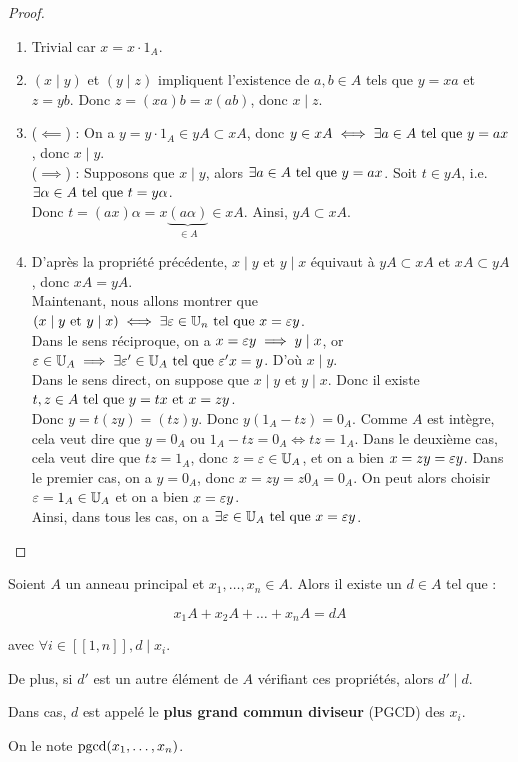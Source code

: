 \documentclass[12pt,a4paper]{report}
\begin{document}
\begin{proof}
    \begin{enumerate}
        \item Trivial car $x = x \cdot 1_A$.
        \item $(x \mid y)$ et $(y \mid z)$ impliquent l'existence de $a,b \in A$ tels que $y = xa$ et $z = yb$. Donc $z = (xa)b = x(ab)$, donc $x \mid z$.
        \item ($\impliedby$) : On a $y=y\cdot 1_A \in yA \subset xA$, donc $y \in xA \iff \exists a \in A \text{ tel que } y = ax$, donc $x\mid y$.\\($\implies$) : Supposons que $x\mid y$, alors $\exists a \in A \text{ tel que } y = ax$. Soit $t \in yA$, i.e. $\exists \alpha \in A \text{ tel que } t = y\alpha$.\\Donc $t = (ax)\alpha = x\underbrace{(a\alpha)}_{\in A} \in xA$. Ainsi, $yA \subset xA$.
        \item D'après la propriété précédente, $x\mid y$ et $y \mid x$ équivaut à $yA \subset xA$ et $xA \subset yA$, donc $xA = yA$.\\Maintenant, nous allons montrer que $(x \mid y \text{ et } y \mid x) \iff \exists \varepsilon \in \mathbb{U}_n \text{ tel que } x = \varepsilon y$.\\Dans le sens réciproque, on a $x=\varepsilon y \implies y \mid x$, or $\varepsilon \in \mathbb{U}_A \implies \exists \varepsilon' \in \mathbb{U}_A \text{ tel que } \varepsilon'x=y$. D'où $x\mid y$.\\Dans le sens direct, on suppose que $x\mid y$ et $y \mid x$. Donc il existe $t,z \in A \text{ tel que } y=tx \text{ et } x=zy$.\\Donc $y=t(zy) = (tz)y$. Donc $y(1_A - tz) = 0_A$. Comme $A$ est intègre, cela veut dire que $y=0_A$ ou $1_A - tz = 0_A \iff tz = 1_A$. Dans le deuxième cas, cela veut dire que $tz=1_A$, donc $z=\varepsilon \in \mathbb{U}_A$, et on a bien $x = zy = \varepsilon y$. Dans le premier cas, on a $y=0_A$, donc $x=zy= z0_A = 0_A$. On peut alors choisir $\varepsilon = 1_A \in \mathbb{U}_A$ et on a bien $x=\varepsilon y$.\\Ainsi, dans tous les cas, on a $\exists \varepsilon \in \mathbb{U}_A \text{ tel que } x = \varepsilon y$.
    \end{enumerate}
\end{proof}

\begin{theorem}
    Soient $A$ un anneau principal et $x_1,\dots,x_n \in A$. Alors il existe un $d \in A$ tel que :

    $$x_1 A + x_2 A + \dots + x_n A = dA$$

    avec $\forall i \in [\![1,n]\!], d \mid x_i$.

    De plus, si $d'$ est un autre élément de $A$ vérifiant ces propriétés, alors $d' \mid d$.

    Dans cas, $d$ est appelé le \textbf{plus grand commun diviseur} (PGCD) des $x_i$.

    On le note $\mathrm{pgcd}(x_1,\dots,x_n)$.
\end{theorem}
\end{document}
